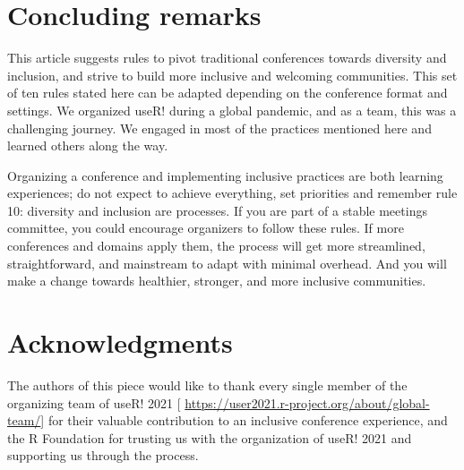 \documentclass[10pt,letterpaper]{article}
\begin{document}
\section*{Concluding remarks}

This article suggests rules to pivot traditional conferences towards diversity and inclusion, and strive to build more inclusive and welcoming communities. 
This set of ten rules stated here can be adapted depending on the conference format and settings.
We organized useR! during a global pandemic, and as a team, this was a challenging journey. 
We engaged in most of the practices mentioned here and learned others along the way. 

Organizing a conference and implementing inclusive practices are both learning experiences;
do not expect to achieve everything, set priorities and remember rule 10: diversity and inclusion are processes. 
If you are part of a stable meetings committee, you could encourage organizers to follow these rules. 
If more conferences and domains apply them, the process will get more streamlined, straightforward, and mainstream to adapt with minimal overhead.
And you will make a change towards healthier, stronger, and more inclusive communities.


\section*{Acknowledgments}
The authors of this piece would like to thank every single member of the organizing team of useR! 2021 [ \url{https://user2021.r-project.org/about/global-team/}] for their valuable contribution to an inclusive conference experience, and the R Foundation for trusting us with the organization of useR! 2021 and supporting us through the process. 








\end{document}
